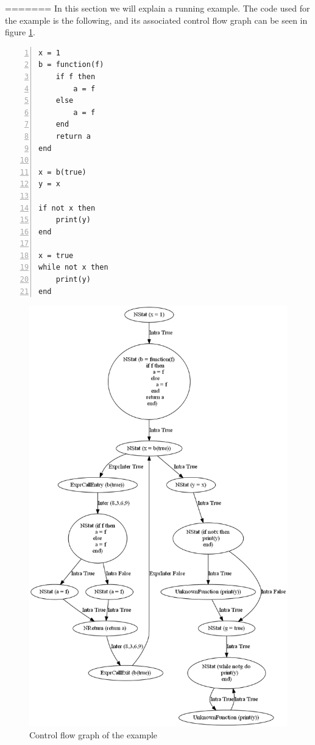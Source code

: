 \documentclass[10pt]{article}
\begin{document}
=======
In this section we will explain a running example. The code used for the example is the following, and its associated control flow graph can be seen in figure \ref{fig:cfg}.\\

\newpage
\begin{lstlisting}[frame=single,numbers=left,caption=Simple example] % lstlisting kent geen Lua, dus maar geen syntax highlighting
x = 1
b = function(f)
    if f then
        a = f
    else
        a = f
    end
    return a
end

x = b(true)
y = x

if not x then
    print(y)
end

x = true
while not x then
    print(y)
end
\end{lstlisting}
\begin{figure}[htp]
    \includegraphics[scale=0.45]{utTesta.png}
    \caption{Control flow graph of the example}
    \label{fig:cfg}
\end{figure}
\end{document}

